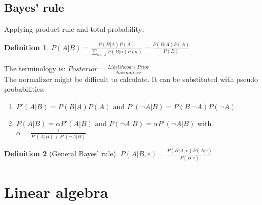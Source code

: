 \documentclass{report}
\newtheorem{definition}{Definition}[section]
\begin{document}
\subsection{Bayes' rule}
\label{chapter:bayesrule}
Applying product rule and total probability:
\begin{definition}
$P(A\vert B) = \frac{P(B\vert A)P(A)}{\sum_{a\in A}{P(B\vert a)P(a)}} = \frac{P(B\vert A)P(A)}{P(B)}$
\end{definition}

The terminology is: $Posterior = \frac{Likelihood\times Prior}{Normalizer}$\\

The normalizer might be difficult to calculate. It can be substituted with pseudo probabilities:
\begin{enumerate}
\item $P'(A\vert B) = P(B\vert A)P(A)$ and $P'(\neg A\vert B) = P(B\vert \neg A)P(\neg A)$
\item $P(A\vert B) = \alpha P'(A\vert B)$ and $P(\neg A\vert B) = \alpha P'(\neg A\vert B)$ with $\alpha = \frac{1}{P'(A\vert B) + P'(\neg A\vert B)}$
\end{enumerate}

\begin{definition}[General Bayes' rule]
$P(A\vert B,e) = \frac{P(B\vert A,e)P(A\vert e)}{P(B\vert e)}$
\end{definition}


\section{Linear algebra}
\end{document}
